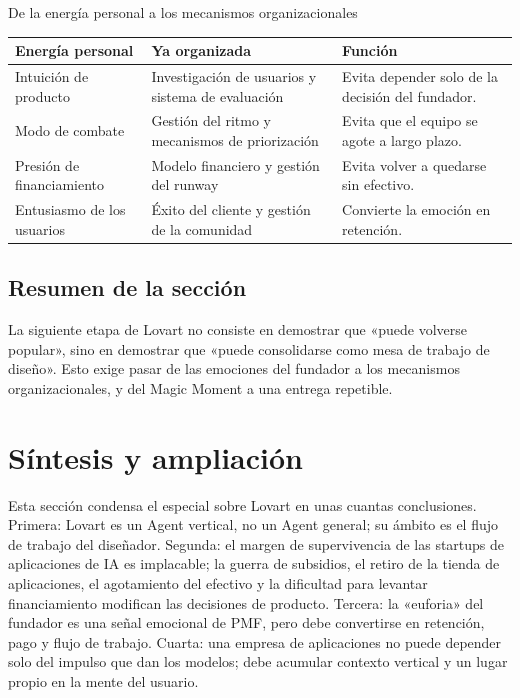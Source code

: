 \documentclass[a4paper]{article}
\begin{document}
\begin{knowledgebox}{De la energía personal a los mecanismos organizacionales}
\begin{tabularx}{\textwidth}{p{}p{}X}
\toprule
Energía personal & Ya organizada & Función \\
\midrule
Intuición de producto & Investigación de usuarios y sistema de evaluación & Evita depender solo de la decisión del fundador. \\
Modo de combate & Gestión del ritmo y mecanismos de priorización & Evita que el equipo se agote a largo plazo. \\
Presión de financiamiento & Modelo financiero y gestión del runway & Evita volver a quedarse sin efectivo. \\
Entusiasmo de los usuarios & Éxito del cliente y gestión de la comunidad & Convierte la emoción en retención. \\
\bottomrule
\end{tabularx}
\end{knowledgebox}

\subsection{Resumen de la sección}

La siguiente etapa de Lovart no consiste en demostrar que «puede volverse popular», sino en demostrar que «puede consolidarse como mesa de trabajo de diseño». Esto exige pasar de las emociones del fundador a los mecanismos organizacionales, y del Magic Moment a una entrega repetible.
\section{Síntesis y ampliación}

Esta sección condensa el especial sobre Lovart en unas cuantas conclusiones. Primera: Lovart es un Agent vertical, no un Agent general; su ámbito es el flujo de trabajo del diseñador. Segunda: el margen de supervivencia de las startups de aplicaciones de IA es implacable; la guerra de subsidios, el retiro de la tienda de aplicaciones, el agotamiento del efectivo y la dificultad para levantar financiamiento modifican las decisiones de producto. Tercera: la «euforia» del fundador es una señal emocional de PMF, pero debe convertirse en retención, pago y flujo de trabajo. Cuarta: una empresa de aplicaciones no puede depender solo del impulso que dan los modelos; debe acumular contexto vertical y un lugar propio en la mente del usuario.
\end{document}
